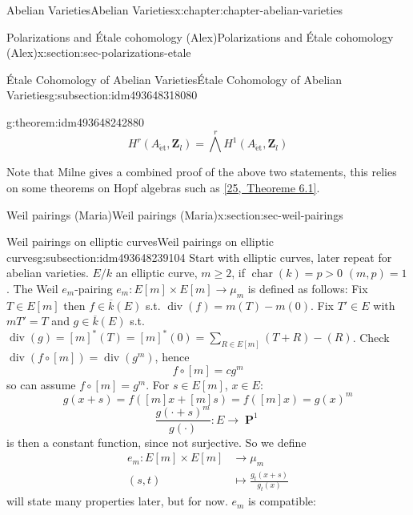 \documentclass[oneside,10pt,]{book}
\numberwithin{equation}{section}
\newcommand{\lb}{[}
\newcommand{\rb}{]}
\newcommand{\ZZ}{\mathbf{Z}}
\newcommand{\et}{\mathrm{\acute{e}t}}
\DeclareMathOperator{\divisor}{div}
\DeclareMathOperator{\characteristic}{char}
\DeclareMathOperator{\PP}{\mathbf{P}}
\newcommand{\gt}{>}
\newcommand{\amp}{&}
\begin{document}
\begin{chapterptx}{Abelian Varieties}{}{Abelian Varieties}{}{}{x:chapter:chapter-abelian-varieties}
\begin{sectionptx}{Polarizations and Étale cohomology (Alex)}{}{Polarizations and Étale cohomology (Alex)}{}{}{x:section:sec-polarizations-etale}
\begin{subsectionptx}{Étale Cohomology of Abelian Varieties}{}{Étale Cohomology of Abelian Varieties}{}{}{g:subsection:idm493648318080}
\begin{theorem}{}{}{g:theorem:idm493648242880}
%
\begin{equation*}
H^r(A_\et, \ZZ_l) = \bigwedge^r H^1(A_\et, \ZZ_l)
\end{equation*}
%
\end{theorem}
Note that Milne gives a combined proof of the above two statements, this relies on some theorems on Hopf algebras such as \hyperlink{x:biblio:bib-borel-hopf}{[25,~Theoreme 6.1]}.%
\end{subsectionptx}
\end{sectionptx}
%
%
\typeout{************************************************}
\typeout{************************************************}
%
\begin{sectionptx}{Weil pairings (Maria)}{}{Weil pairings (Maria)}{}{}{x:section:sec-weil-pairings}
%
%
\typeout{************************************************}
\typeout{************************************************}
%
\begin{subsectionptx}{Weil pairings on elliptic curves}{}{Weil pairings on elliptic curves}{}{}{g:subsection:idm493648239104}
Start with elliptic curves, later repeat for abelian varieties. \(E/k\) an elliptic curve, \(m\ge 2\), if \(\characteristic(k) = p \gt 0\) \((m,p) = 1\). The Weil \(e_m\)-pairing \(e_m \colon E\lb m\rb \times E\lb m \rb \to \mu_m\) is defined as follows: Fix \(T\in E\lb m \rb\) then \(f\in \overline  k (E)\) s.t. \(\divisor(f) = m(T) - m(0)\). Fix \(T' \in E\) with \(mT' = T\) and \(g\in \overline k(E)\) s.t. \(\divisor(g) = \lb m \rb^*(T) = \lb m \rb^*(0)= \sum_{R\in E\lb m \rb} (T+R) - (R)\). Check \(\divisor (f\circ \lb m \rb) = \divisor(g^m)\), hence%
\begin{equation*}
f\circ [m] = c g^m
\end{equation*}
so can assume \(f\circ \lb m \rb = g^m\). For \(s \in E\lb m \rb\), \(x\in E\):%
\begin{equation*}
g(x + s) = f([m]x + [m]s) = f([m]x) = g(x)^m
\end{equation*}
%
\begin{equation*}
\frac{g(\cdot + s)^m}{g(\cdot)} \colon E \to \PP^1
\end{equation*}
is then a constant function, since not surjective. So we define%
\begin{align*}
e_m\colon E[m]\times E[m] \amp\to \mu_m\\
(s,t)\amp \mapsto \frac{g_t(x+s)}{g_t(x)}
\end{align*}
will state many properties later, but for now. \(e_m\) is compatible:%

\end{subsectionptx}
\end{sectionptx}
\end{chapterptx}
\end{document}
